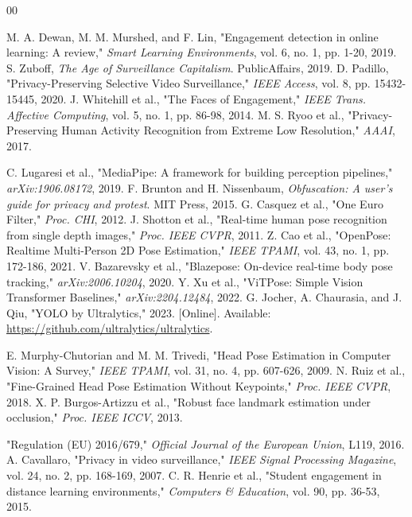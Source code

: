 \documentclass[conference]{IEEEtran}
\begin{document}
\begin{thebibliography}{00}

 M. A. Dewan, M. M. Murshed, and F. Lin, "Engagement detection in online learning: A review," \textit{Smart Learning Environments}, vol. 6, no. 1, pp. 1-20, 2019.
 S. Zuboff, \textit{The Age of Surveillance Capitalism}. PublicAffairs, 2019.
 D. Padillo, "Privacy-Preserving Selective Video Surveillance," \textit{IEEE Access}, vol. 8, pp. 15432-15445, 2020.
 J. Whitehill et al., "The Faces of Engagement," \textit{IEEE Trans. Affective Computing}, vol. 5, no. 1, pp. 86-98, 2014.
 M. S. Ryoo et al., "Privacy-Preserving Human Activity Recognition from Extreme Low Resolution," \textit{AAAI}, 2017.

 C. Lugaresi et al., "MediaPipe: A framework for building perception pipelines," \textit{arXiv:1906.08172}, 2019.
 F. Brunton and H. Nissenbaum, \textit{Obfuscation: A user's guide for privacy and protest}. MIT Press, 2015.
 G. Casquez et al., "One Euro Filter," \textit{Proc. CHI}, 2012.
 J. Shotton et al., "Real-time human pose recognition from single depth images," \textit{Proc. IEEE CVPR}, 2011.
 Z. Cao et al., "OpenPose: Realtime Multi-Person 2D Pose Estimation," \textit{IEEE TPAMI}, vol. 43, no. 1, pp. 172-186, 2021.
 V. Bazarevsky et al., "Blazepose: On-device real-time body pose tracking," \textit{arXiv:2006.10204}, 2020.
 Y. Xu et al., "ViTPose: Simple Vision Transformer Baselines," \textit{arXiv:2204.12484}, 2022.
 G. Jocher, A. Chaurasia, and J. Qiu, "YOLO by Ultralytics," 2023. [Online]. Available: \url{https://github.com/ultralytics/ultralytics}.

 E. Murphy-Chutorian and M. M. Trivedi, "Head Pose Estimation in Computer Vision: A Survey," \textit{IEEE TPAMI}, vol. 31, no. 4, pp. 607-626, 2009.
 N. Ruiz et al., "Fine-Grained Head Pose Estimation Without Keypoints," \textit{Proc. IEEE CVPR}, 2018.
 X. P. Burgos-Artizzu et al., "Robust face landmark estimation under occlusion," \textit{Proc. IEEE ICCV}, 2013.

 "Regulation (EU) 2016/679," \textit{Official Journal of the European Union}, L119, 2016.
 A. Cavallaro, "Privacy in video surveillance," \textit{IEEE Signal Processing Magazine}, vol. 24, no. 2, pp. 168-169, 2007.
 C. R. Henrie et al., "Student engagement in distance learning environments," \textit{Computers \& Education}, vol. 90, pp. 36-53, 2015.


\end{thebibliography}
\end{document}
